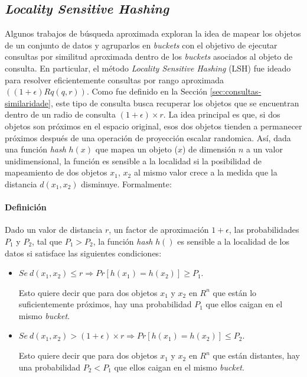 \subsection{\textit{Locality Sensitive Hashing}}\label{sec:lsh}

Algunos trabajos de búsqueda aproximada  \cite{lsh_hamming,Datar2004,hashing_algoritghms_survey} exploran la idea de mapear los objetos de un conjunto de datos y agruparlos en  \textit{buckets} con el objetivo de ejecutar consultas por similitud aproximada dentro de los  \textit{buckets} asociados al objeto de consulta. En particular, el método \textit{Locality Sensitive Hashing} (LSH) fue ideado para resolver eficientemente consultas por rango aproximada $((1+\epsilon) Rq(q, r))$. Como fue definido en la Sección  \ref{sec:consultas-similaridade}, este tipo de consulta busca recuperar los objetos que se encuentran dentro de un radio de consulta $(1+\epsilon) \times r$. La idea principal es que, si dos objetos son próximos en el espacio original, esos dos objetos tienden a permanecer próximos después de una operación de proyección escalar randomica. Así, dada una función \textit{hash} $h(x)$ que mapea un objeto ($x$) de dimensión $n$ a un valor unidimensional, la función es sensible a la localidad si la posibilidad de mapeamiento de dos objetos $x_1$, $x_2$ al mismo valor crece a la medida que la distancia  $d(x_1, x_2)$  disminuye. Formalmente:

\paragraph{Definición} Dado un valor de distancia $r$, un factor de aproximación $1+\epsilon$, las probabilidades $P_1$ y $P_2$, tal que $P_1 > P_2$, la función \textit{hash}  $h()$ es sensible a la localidad de los datos si satisface las siguientes condiciones:

\begin{itemize}
\item $Se \ d(x_1, x_2) \leq r \Rightarrow Pr[h(x_1) = h(x_2)]  \geq P_1$.

Esto quiere decir que para dos objetos  $x_1$ y $x_2$ en $R^n$  que están lo suficientemente próximos,  hay una probabilidad   $P_1$ que ellos caigan en el mismo \textit{bucket}.

\item $Se\ d(x_1, x_2) > (1+\epsilon) \times r  \Rightarrow Pr[h(x_1) = h(x_2)] \leq P_2$.

Esto quiere decir que para dos objetos $x_1$ y $x_2$ en $R^n$ que están distantes, hay una probabilidad $P_2 < P_1$ que ellos caigan en el mismo  \textit{bucket}.

\end{itemize}

